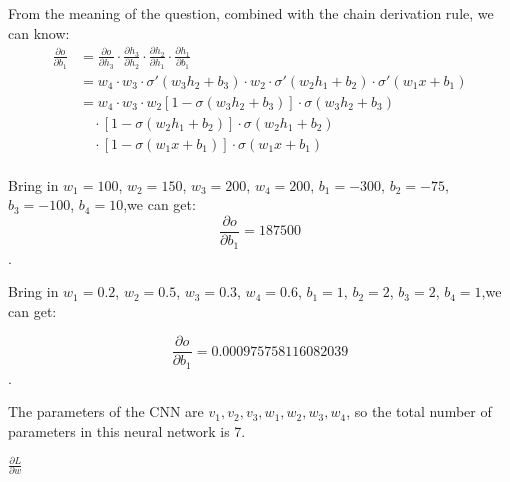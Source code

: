 \documentclass[oneside,solution]{seu-ml-assign}
\begin{document}
From the meaning of the question, combined with the chain derivation rule, we can know:
\begin{equation}
  \begin{aligned}
    \frac{\partial o}{\partial b_1} & = \frac{\partial o}{\partial h_3} \cdot \frac{\partial h_3}{\partial h_2} \cdot \frac{\partial h_2}{\partial h_1} \cdot \frac{\partial h_1}{\partial b_1} \\
                                    & = w_4 \cdot w_3 \cdot \sigma'(w_3 h_2 + b_3) \cdot w_2 \cdot \sigma'(w_2 h_1 + b_2) \cdot \sigma'(w_1 x + b_1)                                            \\
                                    & = w_4 \cdot w_3 \cdot w_2  [1 - \sigma(w_3 h_2 + b_3)] \cdot \sigma(w_3 h_2 + b_3)                                                                                       \\
                                    & \quad \cdot [1 - \sigma(w_2 h_1 + b_2)] \cdot \sigma(w_2 h_1 + b_2)                                                                                       \\
                                    & \quad \cdot [1 - \sigma(w_1 x + b_1)] \cdot \sigma(w_1 x + b_1)                                                                                           \\
  \end{aligned}
\end{equation}


\subproblem{}
Bring in $w_1 = 100$, $w_2 = 150$, $w_3 = 200$, $w_4 = 200$, $b_1 = -300$, $b_2 = -75$, $b_3 = -100$, $b_4 = 10$,we can get:
\begin{equation}
  \frac{\partial o}{\partial b_1} = 187500
\end{equation}.

\subproblem{}
Bring in $w_1 = 0.2$, $w_2 = 0.5$, $w_3 = 0.3$, $w_4 = 0.6$, $b_1 = 1$, $b_2 = 2$, $b_3 = 2$, $b_4 = 1$,we can get:

\begin{equation}
  \frac{\partial o}{\partial b_1} = 0.000975758116082039
\end{equation}.




\subproblem{}
The parameters of the CNN are $v_1, v_2, v_3, w_1, w_2, w_3, w_4$, so the total number of parameters in this neural network is 7.

\subproblem{}
$\frac{\partial L}{\partial w}$
\end{document}
